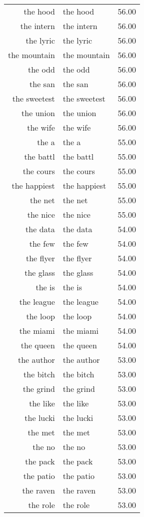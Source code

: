 \begin{table}[ht]
\begin{tabular}{rlr}
  the hood & the hood & 56.00 \\ 
  the intern & the intern & 56.00 \\ 
  the lyric & the lyric & 56.00 \\ 
  the mountain & the mountain & 56.00 \\ 
  the odd & the odd & 56.00 \\ 
  the san & the san & 56.00 \\ 
  the sweetest & the sweetest & 56.00 \\ 
  the union & the union & 56.00 \\ 
  the wife & the wife & 56.00 \\ 
  the a & the a & 55.00 \\ 
  the battl & the battl & 55.00 \\ 
  the cours & the cours & 55.00 \\ 
  the happiest & the happiest & 55.00 \\ 
  the net & the net & 55.00 \\ 
  the nice & the nice & 55.00 \\ 
  the data & the data & 54.00 \\ 
  the few & the few & 54.00 \\ 
  the flyer & the flyer & 54.00 \\ 
  the glass & the glass & 54.00 \\ 
  the is & the is & 54.00 \\ 
  the league & the league & 54.00 \\ 
  the loop & the loop & 54.00 \\ 
  the miami & the miami & 54.00 \\ 
  the queen & the queen & 54.00 \\ 
  the author & the author & 53.00 \\ 
  the bitch & the bitch & 53.00 \\ 
  the grind & the grind & 53.00 \\ 
  the like & the like & 53.00 \\ 
  the lucki & the lucki & 53.00 \\ 
  the met & the met & 53.00 \\ 
  the no & the no & 53.00 \\ 
  the pack & the pack & 53.00 \\ 
  the patio & the patio & 53.00 \\ 
  the raven & the raven & 53.00 \\ 
  the role & the role & 53.00 \\ 

\end{tabular}
\end{table}
